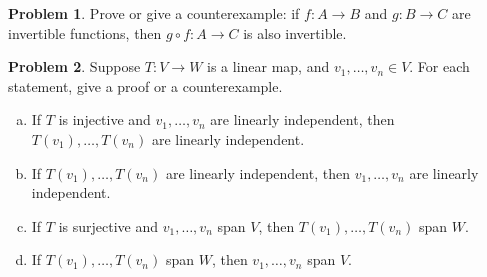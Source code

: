\documentclass[11pt,oneside]{amsart}
\theoremstyle{definition}
\newtheorem{problem}{Problem}
\begin{document}
    \begin{problem}
        Prove or give a counterexample: if $f\colon A\to B$ and $g\colon B\to C$ are invertible functions, then $g\circ f\colon A\to C$ is also invertible.
    \end{problem}
    
    \begin{problem}
        Suppose $T\colon V\to W$ is a linear map, and $v_1,\dots,v_n\in V$. For each statement, give a proof or a counterexample.
        \begin{enumerate}[(a)]
            \item If $T$ is injective and $v_1,\dots,v_n$ are linearly independent, then $T(v_1),\dots,T(v_n)$ are linearly independent.
            \item If $T(v_1),\dots,T(v_n)$ are linearly independent, then $v_1,\dots,v_n$ are linearly independent.
            \item If $T$ is surjective and $v_1,\dots,v_n$ span $V$, then $T(v_1),\dots,T(v_n)$ span $W$.
            \item If $T(v_1),\dots,T(v_n)$ span $W$, then $v_1,\dots,v_n$ span $V$.
        \end{enumerate}
    \end{problem}
\end{document}
